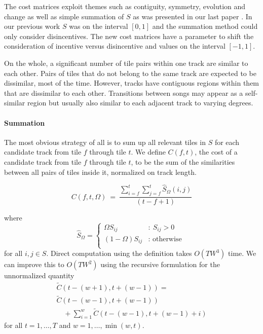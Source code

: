 \documentclass[twocolumn]{article}
\begin{document}
	The cost matrices exploit themes such as contiguity, symmetry, evolution and change as well as simple summation of $S$ as was presented in our last paper \citep{scarfe2013long}. In our previous work $S$ was on the interval $[0,1]$ and the summation method could only consider disincentives. The new cost matrices have a parameter to shift the consideration of incentive versus disincentive and values on the interval $[-1,1]$.
	
	On the whole, a significant number of tile pairs within one track are similar to each other. Pairs of tiles that do not belong to the same track are expected to be dissimilar, most of the time. However, tracks have contiguous regions within them that are dissimilar to each other. Transitions between songs may appear as a self-similar region but usually also similar to each adjacent track to varying degrees.  
	
	\paragraph{Summation}
	
	The most obvious strategy of all is to sum up all relevant tiles in $S$ for each candidate track from tile $f$ through tile $t$. We define $C(f,t)$, the cost of a candidate track from tile $f$ through tile $t$, to be the sum of the similarities between all pairs of tiles inside it, normalized on track length.
	
	\begin{dmath*}
		C(f,t, \Omega) ~=~ \frac{ \sum_{i=f}^{t} \sum_{j=f}^{t} \hat S_\Omega(i,j) }{ (t-f+1) }
	\end{dmath*}
	
	where
	\begin{dmath*}
		\hat S_\Omega=	{ \left\{
			\begin{array}{ll}
				\Omega S_{ij}  & :  ~S_{ij} > 0   \\
				 \left( 1-\Omega \right) S_{ij} & : \mbox{~otherwise~}\\
			\end{array}
			\right.} 
	\end{dmath*} for all $i,j \in S.$ Direct computation using the definition takes $O(TW^3)$ time. We can improve this to $O(TW^2)$ using the recursive formulation for the unnormalized quantity 
	\begin{dmath*} 
		\begin{array}{ll}
		\tilde C( t-(w+1),t+(w-1) ) = \\
		 \tilde C( t-(w-1),t+(w-1) ) \\
		\hspace{1em} +  \sum_{i=1}^{w} \tilde C(t-(w-1),t+(w-1)+i)
		\end{array}
	\end{dmath*} for all $t=1,\ldots, T$ and $w=1,\ldots,\min(w,t)$.
	
\end{document}
